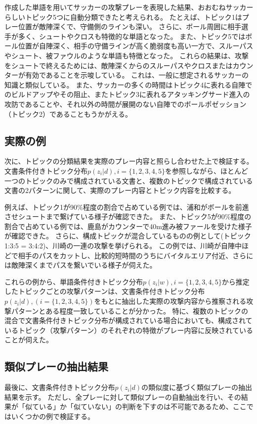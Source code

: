 作成した単語を用いてサッカーの攻撃プレーを表現した結果、おおむねサッカーらしいトピック5つに自動分類できたと考えられる。
たとえば、トピック1はプレー位置が敵陣深くで、守備側のラインも深い。
さらに、ボール周囲に相手選手が多く、シュートやクロスも特徴的な単語となった。
また、トピック5ではボール位置が自陣深く、相手の守備ラインが高く脆弱度も高い一方で、スルーパスやシュート、被ファウルのような単語も特徴となった。
これらの結果は、攻撃をシュートで終えるためには、敵陣深くからのスルーパスやクロスまたはカウンターが有効であることを示唆している。
これは、一般に想定されるサッカーの知識と類似している。
また、サッカーの多くの時間はトピック4に表れる自陣でのビルドアップやその阻止、またトピック3に表れるアタッキングサード進入の攻防であることや、それ以外の時間が展開のない自陣でのボールポゼッション（トピック2）であることもうかがえる。



\subsection{実際の例}
次に、トピックの分類結果を実際のプレー内容と照らし合わせた上で検証する。
文書条件付きトピック分布$p(z_i|d),i=\{1,2,3,4,5\}$を参照しながら、ほとんど一つのトピックのみで構成されている文書と、複数のトピックで構成されている文書の2パターンに関して、実際のプレー内容とトピック内容を比較する。

例えば、トピック1が90\%程度の割合で占めている例では、浦和がボールを前進させシュートまで繋げている様子が確認できた。
また、トピック5が90\%程度の割合で占めている例では、鹿島がカウンターで40m進み被ファールを受けた様子が確認できた。
さらに、構成トピックが混合しているものの例として(トピック1:3:5 = 3:4:2)、川崎の一連の攻撃を挙げられる。
この例では、川崎が自陣中ほどで相手のパスをカットし、比較的短時間のうちにバイタルエリア付近、さらには敵陣深くまでパスを繋いでいる様子が伺えた。

これらの例から、単語条件付きトピック分布$p(z_i|w),i=\{1,2,3,4,5\}$から推定したトピックごとの攻撃パターンは、文書条件付きトピック分布$p(z_i|d),(i=\{1,2,3,4,5\})$をもとに抽出した実際の攻撃内容から推察される攻撃パターンとある程度一致していることが分かった。
特に、複数のトピックの混合で文書条件付きトピック分布が構成されている場合においても、構成されているトピック（攻撃パターン）のそれぞれの特徴がプレー内容に反映されていることが伺えた。


\subsection{類似プレーの抽出結果}
最後に、文書条件付きトピック分布$p(z_i|d)$の類似度に基づく類似プレーの抽出結果を示す。
ただし、全プレーに対して類似プレーの自動抽出を行い、その結果が「似ている」か「似ていない」の判断を下すのは不可能であるため、ここではいくつかの例で検証する。

